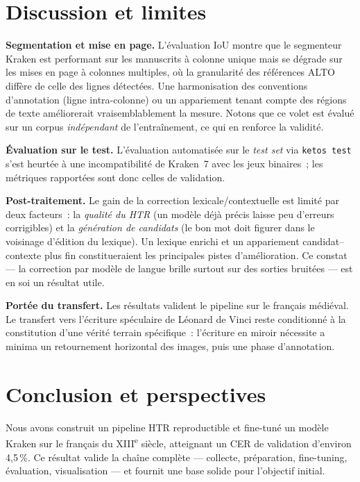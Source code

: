 \documentclass[10pt,journal,a4paper]{IEEEtran}
\begin{document}
\section{Discussion et limites}
\textbf{Segmentation et mise en page.} L'évaluation IoU montre que le segmenteur
Kraken est performant sur les manuscrits à colonne unique mais se dégrade sur les
mises en page à colonnes multiples, où la granularité des références ALTO diffère
de celle des lignes détectées. Une harmonisation des conventions d'annotation
(ligne intra-colonne) ou un appariement tenant compte des régions de texte
améliorerait vraisemblablement la mesure. Notons que ce volet est évalué sur un
corpus \emph{indépendant} de l'entraînement, ce qui en renforce la validité.

\textbf{Évaluation sur le test.} L'évaluation automatisée sur le \textit{test
set} via \texttt{ketos test} s'est heurtée à une incompatibilité de Kraken~7
avec les jeux binaires~; les métriques rapportées sont donc celles de
validation.

\textbf{Post-traitement.} Le gain de la correction lexicale/contextuelle est
limité par deux facteurs~: la \emph{qualité du HTR} (un modèle déjà précis
laisse peu d'erreurs corrigibles) et la \emph{génération de candidats} (le bon
mot doit figurer dans le voisinage d'édition du lexique). Un lexique enrichi et
un appariement candidat--contexte plus fin constitueraient les principales pistes
d'amélioration. Ce constat --- la correction par modèle de langue brille surtout
sur des sorties bruitées --- est en soi un résultat utile.

\textbf{Portée du transfert.} Les résultats valident le pipeline sur le français
médiéval. Le transfert vers l'écriture spéculaire de Léonard de Vinci reste
conditionné à la constitution d'une vérité terrain spécifique~: l'écriture en
miroir nécessite a minima un retournement horizontal des images, puis une phase
d'annotation.

\section{Conclusion et perspectives}
Nous avons construit un pipeline HTR reproductible et fine-tuné un modèle Kraken
sur le français du XIII\textsuperscript{e} siècle, atteignant un CER de
validation d'environ 4,5\,\%. Ce résultat valide la chaîne complète --- collecte,
préparation, fine-tuning, évaluation, visualisation --- et fournit une base
solide pour l'objectif initial.
\end{document}
